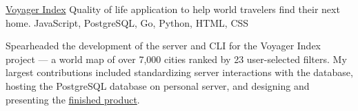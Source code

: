 \showoff
{\textcolor{my-blue}{\href{https://voyager-index.herokuapp.com}{Voyager Index}}}
{Quality of life application to help world travelers find their next home.}
{JavaScript, PostgreSQL, Go, Python, HTML, CSS}
{}

Spearheaded the development of the server and CLI for the Voyager Index project — a world map of over 7,000 cities ranked by 23 user-selected filters. My largest contributions included standardizing server interactions with the database, hosting the PostgreSQL database on personal server, and designing and presenting the \textcolor{my-blue}{\href{https://liambeckman.com/pkgs/posters/voyager-index.pdf}{finished product}}.

